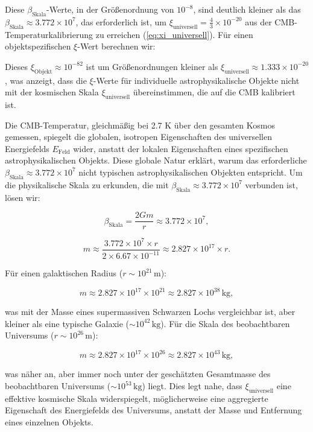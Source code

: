 \documentclass[12pt,a4paper]{report}
\newcommand{\Efield}{E_{\text{Feld}}}
\newcommand{\xipar}{\xi}
\newcommand{\xiuniversal}{\xi_{\text{universell}}}
\newcommand{\betascale}{\beta_{\text{Skala}}}
\theoremstyle{definition}
\begin{document}
	Diese $\betascale$-Werte, in der Größenordnung von $10^{-8}$, sind deutlich kleiner als das $\betascale \approx 3.772 \times 10^7$, das erforderlich ist, um $\xiuniversal = \frac{4}{3} \times 10^{-20}$ aus der CMB-Temperaturkalibrierung zu erreichen (\cref{eq:xi_universell}). Für einen objektspezifischen $\xipar$-Wert berechnen wir:
	
	Dieses $\xi_{\text{Objekt}} \approx 10^{-82}$ ist um Größenordnungen kleiner als $\xiuniversal \approx 1.333 \times 10^{-20}$, was anzeigt, dass die $\xipar$-Werte für individuelle astrophysikalische Objekte nicht mit der kosmischen Skala $\xiuniversal$ übereinstimmen, die auf die CMB kalibriert ist.
	
	Die CMB-Temperatur, gleichmäßig bei 2.7 K über den gesamten Kosmos gemessen, spiegelt die globalen, isotropen Eigenschaften des universellen Energiefelds $\Efield$ wider, anstatt der lokalen Eigenschaften eines spezifischen astrophysikalischen Objekts. Diese globale Natur erklärt, warum das erforderliche $\betascale \approx 3.772 \times 10^7$ nicht typischen astrophysikalischen Objekten entspricht. Um die physikalische Skala zu erkunden, die mit $\betascale \approx 3.772 \times 10^7$ verbunden ist, lösen wir:
	
	$$\betascale = \frac{2Gm}{r} \approx 3.772 \times 10^7,$$
	
	$$m \approx \frac{3.772 \times 10^7 \times r}{2 \times 6.67 \times 10^{-11}} \approx 2.827 \times 10^{17} \times r.$$
	
	Für einen galaktischen Radius ($r \sim 10^{21} \, \text{m}$):
	
	$$m \approx 2.827 \times 10^{17} \times 10^{21} \approx 2.827 \times 10^{38} \, \text{kg},$$
	
	was mit der Masse eines supermassiven Schwarzen Lochs vergleichbar ist, aber kleiner als eine typische Galaxie ($\sim 10^{42} \, \text{kg}$). Für die Skala des beobachtbaren Universums ($r \sim 10^{26} \, \text{m}$):
	
	$$m \approx 2.827 \times 10^{17} \times 10^{26} \approx 2.827 \times 10^{43} \, \text{kg},$$
	
	was näher an, aber immer noch unter der geschätzten Gesamtmasse des beobachtbaren Universums ($\sim 10^{53} \, \text{kg}$) liegt. Dies legt nahe, dass $\xiuniversal$ eine effektive kosmische Skala widerspiegelt, möglicherweise eine aggregierte Eigenschaft des Energiefelds des Universums, anstatt der Masse und Entfernung eines einzelnen Objekts.
	
\end{document}
